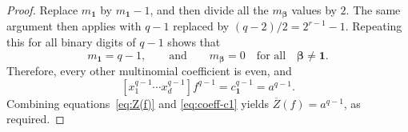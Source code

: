 \documentclass[10pt,a4paper]{amsart}
\begin{document}
\begin{proof}
Replace $m_{\mathbf 1}$ by $m_{\mathbf 1}-1$, and then divide all the $m_{\boldsymbol{\beta}}$ values by $2$. The same argument then applies with $q-1$ replaced by $(q-2)/2=2^{r-1}-1$. Repeating this for all binary digits of $q-1$ shows that
\[
m_{\mathbf 1}=q-1, \qquad \text{and}
\qquad
m_{\boldsymbol{\beta}}=0 \quad \text{for all} \quad \boldsymbol{\beta}\ne\mathbf 1.
\]
Therefore, every other multinomial coefficient is even, and
\begin{equation}\label{eq:coeff-c1}
[x_1^{q-1}\cdots x_d^{q-1}]f^{q-1}
=c_{\mathbf 1}^{q-1}=a^{q-1}.
\end{equation}
Combining equations~\eqref{eq:Z(f)} and \eqref{eq:coeff-c1} yields $\overline{Z}(f)=a^{q-1}$, 
as required.
\end{proof}
\end{document}
